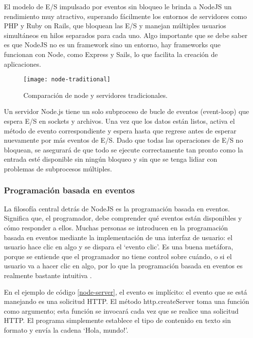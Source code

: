 El modelo de E/S impulsado por eventos sin bloqueo le brinda a NodeJS un rendimiento muy atractivo, superando fácilmente los entornos de servidores como PHP y Ruby on Rails, que bloquean las E/S y manejan múltiples usuarios simultáneos en hilos separados para cada uno. Algo importante que se debe saber es que NodeJS no es un \gls{framework} sino un entorno, hay \glspl{framework} que funcionan con Node, como Express y Sails, lo que facilita la creación de aplicaciones.
\vspace{0.8cm}

\begin{figure}[H]
  \centering
  \texttt{[image: node-traditional]}
  \caption{Comparación de node y servidores tradicionales.}
\end{figure}

Un servidor Node.js tiene un solo subproceso de bucle de eventos (event-loop) que espera E/S en sockets y archivos. Una vez que los datos están listos, activa el método de evento correspondiente y espera hasta que regrese antes de esperar nuevamente por más eventos de E/S. Dado que todas las operaciones de E/S no bloquean, se asegurará de que todo se ejecute correctamente tan pronto como la entrada esté disponible sin ningún bloqueo y sin que se tenga lidiar con problemas de subprocesos múltiples.

\newpage
\subsubsection{Programación basada en eventos}
La filosofía central detrás de NodeJS es la programación basada en eventos. Significa que, el programador,  debe comprender qué eventos están disponibles y cómo responder a ellos. Muchas personas se introducen en la programación basada en eventos mediante la implementación de una interfaz de usuario: el usuario hace clic en algo y se dispara el `evento clic'. Es una buena metáfora, porque se entiende que el programador no tiene control sobre cuándo, o si el usuario va a hacer clic en algo, por lo que la programación basada en eventos es realmente bastante intuitiva \cite{ethan}.
\vspace{0.8cm}


En el ejemplo de código \ref{node-server}, el evento es implícito: el evento que se está manejando es una solicitud HTTP. El método http.createServer toma una función como argumento; esta función se invocará cada vez que se realice una solicitud HTTP. El programa simplemente establece el tipo de contenido en texto sin formato y envía la cadena `Hola, mundo!'.
